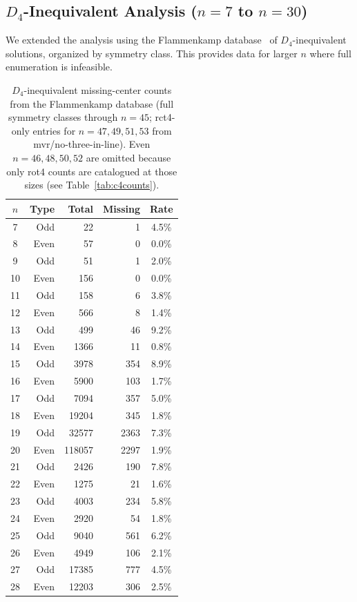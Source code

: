 \documentclass[11pt,a4paper]{article}
\theoremstyle{plain}
\theoremstyle{definition}
\begin{document}
\subsection{$D_4$-Inequivalent Analysis ($n=7$ to $n=30$)}

We extended the analysis using the Flammenkamp database~\cite{flammenkamp} of $D_4$-inequivalent solutions, organized by symmetry class. This provides data for larger $n$ where full enumeration is infeasible.

\begin{table}[H]
\centering
\caption{$D_4$-inequivalent missing-center counts from the Flammenkamp database (full symmetry classes through $n=45$; rct4-only entries for $n=47,49,51,53$ from mvr/no-three-in-line). Even $n=46,48,50,52$ are omitted because only rot4 counts are catalogued at those sizes (see Table~\ref{tab:c4counts}).}
\label{tab:d4}
\footnotesize
\begin{tabular}{crrrc}
\toprule
$n$ & Type & Total & Missing & Rate \\
\midrule
7 & Odd & 22 & 1 & 4.5\%\\
8 & Even & 57 & 0 & 0.0\%\\
9 & Odd & 51 & 1 & 2.0\%\\
10 & Even & 156 & 0 & 0.0\%\\
11 & Odd & 158 & 6 & 3.8\%\\
12 & Even & 566 & 8 & 1.4\%\\
13 & Odd & 499 & 46 & 9.2\%\\
14 & Even & 1366 & 11 & 0.8\%\\
15 & Odd & 3978 & 354 & 8.9\%\\
16 & Even & 5900 & 103 & 1.7\%\\
17 & Odd & 7094 & 357 & 5.0\%\\
18 & Even & 19204 & 345 & 1.8\%\\
19 & Odd & 32577 & 2363 & 7.3\%\\
20 & Even & 118057 & 2297 & 1.9\%\\
21 & Odd & 2426 & 190 & 7.8\%\\
22 & Even & 1275 & 21 & 1.6\%\\
23 & Odd & 4003 & 234 & 5.8\%\\
24 & Even & 2920 & 54 & 1.8\%\\
25 & Odd & 9040 & 561 & 6.2\%\\
26 & Even & 4949 & 106 & 2.1\%\\
27 & Odd & 17385 & 777 & 4.5\%\\
28 & Even & 12203 & 306 & 2.5\%\\

\end{tabular}
\end{table}
\end{document}
